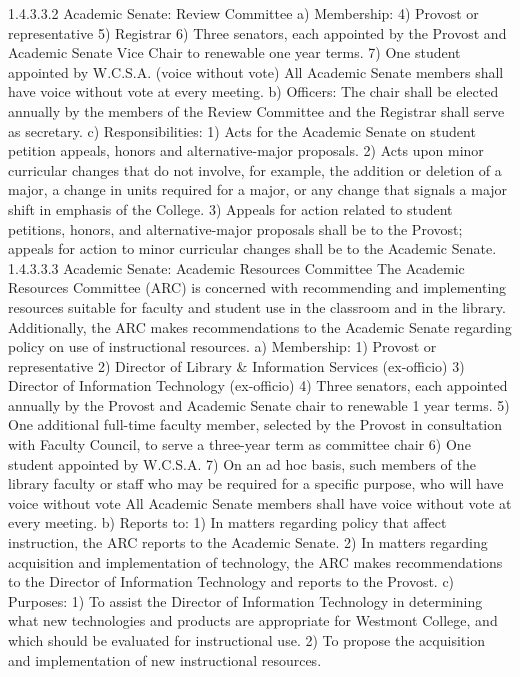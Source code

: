 \documentclass[letterpaper, 11pt]{article}
\begin{document}
1.4.3.3.2 Academic Senate:  Review Committee
a) Membership:
4) Provost or representative
5) Registrar
6) Three senators, each appointed by the Provost and Academic Senate Vice Chair to renewable one year terms.
7) One student appointed by W.C.S.A. (voice without vote)
   All Academic Senate members shall have voice without vote at every meeting.
b) Officers:
   The chair shall be elected annually by the members of the Review Committee and the Registrar shall serve as secretary.
c) Responsibilities:
1) Acts for the Academic Senate on student petition appeals, honors and alternative-major proposals.
2) Acts upon minor curricular changes that do not involve, for example, the addition or deletion of a major, a change in units required for a major, or any change that signals a major shift in emphasis of the College.
3) Appeals for action related to student petitions, honors, and alternative-major proposals shall be to the Provost; appeals for action to minor curricular changes shall be to the Academic Senate.
1.4.3.3.3 Academic Senate:  Academic Resources Committee
   The Academic Resources Committee (ARC) is concerned with recommending and implementing resources suitable for faculty and student use in the classroom and in the library.  Additionally, the ARC makes recommendations to the Academic Senate regarding policy on use of instructional resources.
a) Membership: 
1) Provost or representative
2) Director of Library & Information Services (ex-officio)
3) Director of Information Technology (ex-officio)
4) Three senators, each appointed annually by the Provost and Academic Senate chair to renewable 1 year terms.
5) One additional full-time faculty member, selected by the Provost in consultation with Faculty Council, to serve a three-year term as committee chair
6) One student appointed by W.C.S.A.
7) On an ad hoc basis, such members of the library faculty or staff who may be required for a specific purpose, who will have voice without vote
   All Academic Senate members shall have voice without vote at every meeting.
b) Reports to:
1) In matters regarding policy that affect instruction, the ARC reports to the Academic Senate.
2) In matters regarding acquisition and implementation of technology, the ARC makes recommendations to the Director of Information Technology and reports to the Provost.
c) Purposes:
1) To assist the Director of Information Technology in determining what new technologies and products are appropriate for Westmont College, and which should be evaluated for instructional use.
2) To propose the acquisition and implementation of new instructional resources.
\end{document}
